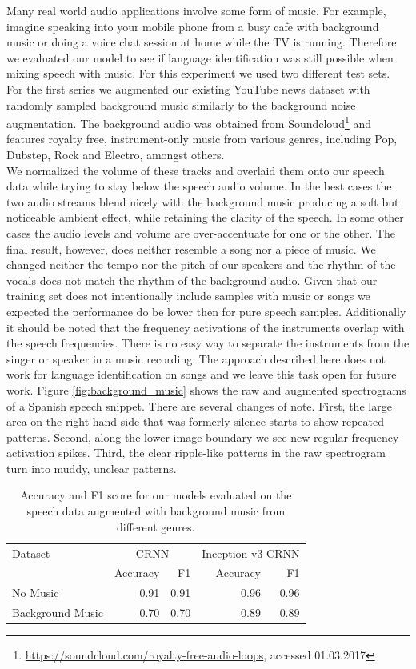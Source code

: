 Many real world audio applications involve some form of music. For example, imagine speaking into your mobile phone from a busy cafe with background music or doing a voice chat session at home while the TV is running. Therefore we evaluated our model to see if language identification was still possible when mixing speech with music. For this experiment we used two different test sets. For the first series we augmented our existing YouTube news dataset with randomly sampled background music similarly to the background noise augmentation. The background audio was obtained from Soundcloud\footnote{\url{https://soundcloud.com/royalty-free-audio-loops}, accessed 01.03.2017} and features royalty free, instrument-only music from various genres, including Pop, Dubstep, Rock and Electro, amongst others.\\ 
We normalized the volume of these tracks and overlaid them onto our speech data while trying to stay below the speech audio volume. In the best cases the two audio streams blend nicely with the background music producing a soft but noticeable ambient effect, while retaining the clarity of the speech. In some other cases the audio levels and volume are over-accentuate for one or the other. The final result, however, does neither resemble a song nor a piece of music. We changed neither the tempo nor the pitch of our speakers and the rhythm of the vocals does not match the rhythm of the background audio. Given that our training set does not intentionally include samples with music or songs we expected the performance do be lower then for pure speech samples. Additionally it should be noted that the frequency activations of the instruments overlap with the speech frequencies. There is no easy way to separate the instruments from the singer or speaker in a music recording. The approach described here does not work for language identification on songs and we leave this task open for future work. Figure \ref{fig:background_music} shows the raw and augmented spectrograms of a Spanish speech snippet. There are several changes of note. First, the large area on the right hand side that was formerly silence starts to show repeated patterns. Second, along the lower image boundary we see new regular frequency activation spikes. Third, the clear ripple-like patterns in the raw spectrogram turn into muddy, unclear patterns.

	\begin{table}[]
	\centering
	\begin{tabularx}{\textwidth}{lrrrr}
	\toprule
Dataset & \multicolumn{2}{c}{CRNN} & \multicolumn{2}{c}{Inception-v3 CRNN} \\   
                  & Accuracy  & F1    & Accuracy   & F1   \\ \midrule
No Music		  & 0.91		  & 0.91	  & 0.96	  & 0.96 \\                     
Background Music  & 0.70      & 0.70  & 0.89  & 0.89 \\
 	\bottomrule
	\end{tabularx}
	\caption{Accuracy and F1 score for our models evaluated on the speech data augmented with background music from different genres.}
	\label{tab:audio_duration}
	\end{table}

